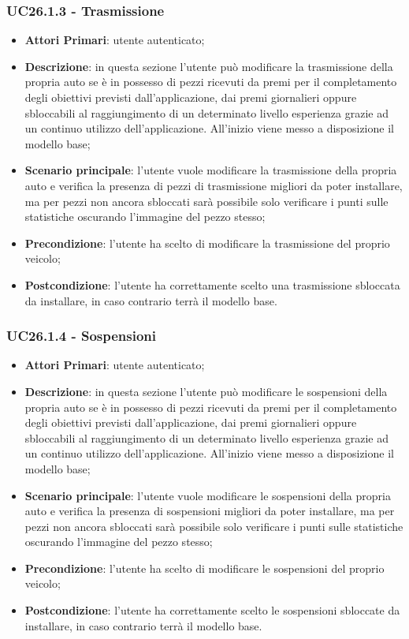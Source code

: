 \subsubsection{UC26.1.3 - Trasmissione}
\begin{itemize}
	\item \textbf{Attori Primari}: utente autenticato;
	\item \textbf{Descrizione}: in questa sezione l'utente può modificare la trasmissione della propria auto se è in possesso di pezzi ricevuti da premi per il completamento degli obiettivi previsti dall'applicazione, dai premi giornalieri oppure sbloccabili al raggiungimento di un determinato livello esperienza grazie ad un continuo utilizzo dell'applicazione.
	All'inizio viene messo a disposizione il modello base;
	\item \textbf{Scenario principale}: l'utente vuole modificare la trasmissione della propria auto e verifica la presenza di pezzi di trasmissione migliori da poter installare, ma per pezzi non ancora sbloccati sarà possibile solo verificare i punti sulle statistiche oscurando l'immagine del pezzo stesso;
	\item \textbf{Precondizione}: l'utente ha scelto di modificare la trasmissione del proprio veicolo; 
	\item \textbf{Postcondizione}: l'utente ha correttamente scelto una trasmissione sbloccata da installare, in caso contrario terrà il modello base.
\end{itemize}
\subsubsection{UC26.1.4 - Sospensioni}
\begin{itemize}
	\item \textbf{Attori Primari}: utente autenticato;
	\item \textbf{Descrizione}: in questa sezione l'utente può modificare le sospensioni della propria auto se è in possesso di pezzi ricevuti da premi per il completamento degli obiettivi previsti dall'applicazione, dai premi giornalieri oppure sbloccabili al raggiungimento di un determinato livello esperienza grazie ad un continuo utilizzo dell'applicazione.
	All'inizio viene messo a disposizione il modello base;
	\item \textbf{Scenario principale}: l'utente vuole modificare le sospensioni della propria auto e verifica la presenza di sospensioni migliori da poter installare, ma per pezzi non ancora sbloccati sarà possibile solo verificare i punti sulle statistiche oscurando l'immagine del pezzo stesso;
	\item \textbf{Precondizione}: l'utente ha scelto di modificare le sospensioni del proprio veicolo; 
	\item \textbf{Postcondizione}: l'utente ha correttamente scelto le sospensioni sbloccate da installare, in caso contrario terrà il modello base.
\end{itemize}
